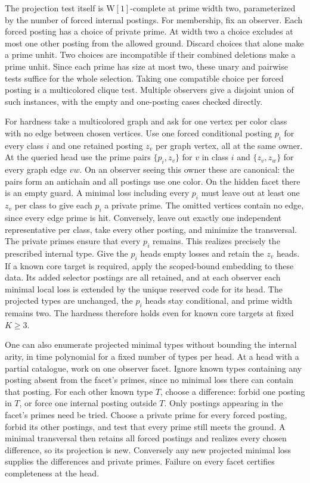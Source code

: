 The projection test itself is
$\mathrm{W}[1]$-complete at prime width two,
parameterized by the number of forced
internal postings. For membership, fix
an observer. Each forced posting has a
choice of private prime. At width two a
choice excludes at most one other posting
from the allowed ground. Discard choices
that alone make a prime unhit. Two choices
are incompatible if their combined
deletions make a prime unhit. Since each
prime has size at most two, these unary
and pairwise tests suffice for the whole
selection. Taking one compatible choice
per forced posting is a multicolored
clique test. Multiple observers give a
disjoint union of such instances, with
the empty and one-posting cases checked
directly.

For hardness take a multicolored graph
and ask for one vertex per color class
with no edge between chosen vertices.
Use one forced conditional posting $p_i$
for every class $i$ and one retained
posting $z_v$ per graph vertex, all at the
same owner. At the queried head use the
prime pairs $\{p_i,z_v\}$ for $v$ in class
$i$ and $\{z_v,z_w\}$ for every graph edge
$vw$. On an observer seeing this owner
these are canonical: the pairs form an
antichain and all postings use one color.
On the hidden facet there is an empty
guard. A minimal loss including every
$p_i$ must leave out at least one $z_v$
per class to give each $p_i$ a private
prime. The omitted vertices contain no
edge, since every edge prime is hit.
Conversely, leave out exactly one
independent representative per class,
take every other posting, and minimize
the transversal. The private primes
ensure that every $p_i$ remains.
This realizes precisely the prescribed
internal type. Give the $p_i$ heads
empty losses and retain the $z_v$ heads.
If a known core target is required, apply
the scoped-bound embedding to these
data. Its added selector postings are
all retained, and at each observer each
minimal local loss is extended by the
unique reserved code for its head.
The projected types are unchanged,
the $p_i$ heads stay conditional, and
prime width remains two. The hardness
therefore holds even for known core
targets at fixed $K\geq3$.

One can also enumerate projected minimal
types without bounding the internal arity,
in time polynomial for a fixed number of
types per head. At a head with a partial
catalogue, work on one observer facet.
Ignore known types containing any posting
absent from the facet's primes, since no
minimal loss there can contain that posting. For each other known type $T$,
choose a difference: forbid one posting in
$T$, or force one internal posting outside
$T$. Only postings appearing in the
facet's primes need be tried. Choose a
private prime for every forced posting,
forbid its other postings, and test that
every prime still meets the ground.
A minimal transversal then retains all
forced postings and realizes every chosen
difference, so its projection is new.
Conversely any new projected minimal
loss supplies the differences and private
primes. Failure on every facet certifies
completeness at the head.

